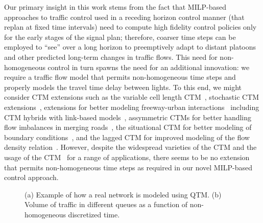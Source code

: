 Our primary insight in this work stems from the fact that MILP-based
approaches to traffic control used in a receding horizon control
manner (that replan at fixed time intervals) need to compute high
fidelity control policies only for the early stages of the signal
plan; therefore, coarser time steps can be employed to ``see'' over a
long horizon to preemptively adapt to distant platoons and other
predicted long-term changes in traffic flows.
This need for non-homogeneous control in
turn spawns the need for an additional innovation: we require a
traffic flow
model that permits non-homogeneous time steps
and properly models the travel time delay between lights.  To this
end, we might consider CTM extensions such as the variable cell length
CTM~, stochastic CTM
extensions~,
extensions for better modeling freeway-urban
interactions~ including CTM hybrids with
link-based models~, assymmetric CTMs
for better handling flow imbalances in merging
roads~, the situational CTM for better
modeling of boundary conditions~, and the
lagged CTM for improved modeling of the flow density
relation~.  However, despite the widespread
varieties of the CTM and the usage of the
CTM~ for a range of applications,
there seems to be no extension that permits non-homogeneous time steps
as required in our novel MILP-based control approach.


\begin{figure*}[t!]
\centering
\caption{(a) Example of how a real network is modeled using QTM. (b) Volume of
traffic in different queues as a function of non-homogeneous discretized time.}
%
\end{figure*}




